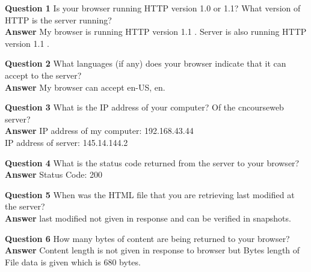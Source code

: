 \documentclass[14pt]{extarticle}
\begin{document}
    \noindent
    \textbf{\large Question 1}
    Is your browser running HTTP version 1.0 or 1.1?  What version of HTTP is the server running?\\
    \textbf{\large Answer}
    My browser is running HTTP version 1.1 . Server is also running HTTP version 1.1 .\\
    \vspace{1cm}
    
    \noindent
    \textbf{\large Question 2}
    What languages (if any) does your browser indicate that it can accept to the server?\\
    \textbf{\large Answer}
    My browser can accept en-US, en.\\
    \vspace{1cm}
    
    \noindent
    \textbf{\large Question 3}
    What is the IP address of your computer?  Of the cncourseweb server?\\
    \textbf{\large Answer}
    IP address of my computer: 192.168.43.44\\
    IP address of server: 145.14.144.2\\
    \vspace{1cm}
    
    \noindent
    \textbf{\large Question 4}
    What is the status code returned from the server to your browser?\\
    \textbf{\large Answer}
    Status Code: 200\\
    \vspace{1cm}
    
    \noindent
    \textbf{\large Question 5}
    When was the HTML file that you are retrieving last modified at the server?\\
    \textbf{\large Answer}
    last modified not given in response and can be verified in snapshots.\\
    \vspace{1cm}
    
    \noindent
    \textbf{\large Question 6}
    How many bytes of content are being returned to your browser?\\
    \textbf{\large Answer}
    Content length is not given in response to browser but Bytes length of File data is given which is 680 bytes.\\
    \vspace{1cm}
    
\end{document}
